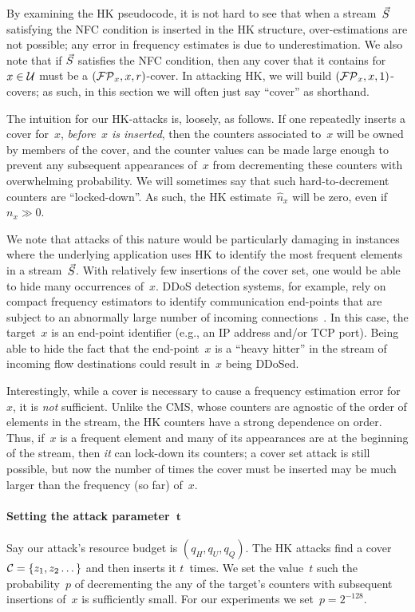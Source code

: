 
By examining the HK pseudocode, it is not hard to see that when a stream~$\vec{S}$ satisfying the NFC condition is inserted in the HK structure, over-estimations are not possible; any error in frequency estimates is due to underestimation. 
%
We also note that if $\vec{S}$ satisfies the NFC condition, then any cover that it contains for $x \in \mathcal{U}$ must be a $(\mathcal{FP}_x,x,r)$-cover. In attacking HK, we will build $(\mathcal{FP}_x,x,1)$-covers; as such, in this section we will often just say ``cover'' as shorthand.  

The intuition for our HK-attacks is, loosely, as follows.  If one repeatedly inserts a cover for~$x$, \emph{before~$x$ is inserted}, then the counters associated to~$x$ will be owned by members of the cover, and the counter values can be made large enough to prevent any subsequent appearances of~$x$ from decrementing these counters with overwhelming probability.  We will sometimes say that such hard-to-decrement counters are ``locked-down''. As such, the HK estimate~$\hat{n}_x$ will be zero, even if $n_x \gg 0$. 

We note that attacks of this nature would be particularly damaging in instances where the underlying application uses HK to identify the most frequent elements in a stream~$\vec{S}$. With relatively few insertions of the cover set, one would be able to hide many occurrences of~$x$.  DDoS detection systems, for example, rely on compact frequency estimators to identify communication end-points that are subject to an abnormally large number of incoming connections~\cite{Liu_Sun_Kim_2011}. In this case, the target~$x$ is an end-point identifier (e.g., an IP address and/or TCP port). Being able to hide the fact that the end-point~$x$ is a ``heavy hitter'' in the stream of incoming flow destinations could result in~$x$ being DDoSed. 

Interestingly, while a cover is necessary to cause a frequency estimation error for~$x$, it is \emph{not} sufficient.  Unlike the CMS, whose counters are agnostic of the order of elements in the stream, the HK counters have a strong dependence on order.  Thus, if~$x$ is a frequent element and many of its appearances are at the beginning of the stream, then \emph{it} can lock-down its counters; a cover set attack is still possible, but now the number of times the cover must be inserted may be much larger than the frequency (so far) of~$x$.  

\paragraph{Setting the attack parameter~$\mathbf{t}$} Say our attack's resource budget is $(q_H,q_U,q_Q)$. The HK attacks find a cover $\mathcal{C} = \{z_1, z_2\dots\}$ and then inserts it $t$~times. We set the value~$t$ such the probability~$p$ of decrementing the any of the target's counters with subsequent insertions of~$x$ is sufficiently small. For our experiments we set~$p = 2^{-128}$.
 
